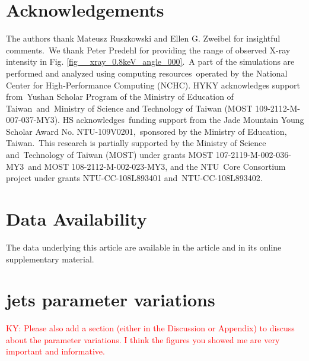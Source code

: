 \documentclass[fleqn,usenatbib,useAMS]{mnras}
\begin{document}
\section{Acknowledgements}
The authors thank Mateusz Ruszkowski and Ellen G. Zweibel for insightful comments.\
We thank Peter Predehl for providing the range of observed X-ray intensity in Fig. \ref{fig__xray_0.8keV_angle_000}.\
A part of the simulations are performed and analyzed using computing resources\
operated by the National Center for High-Performance Computing (NCHC).
HYKY acknowledges support from\
Yushan Scholar Program of the Ministry of Education of Taiwan\
and\
Ministry of Science and Technology of Taiwan (MOST 109-2112-M-007-037-MY3).
HS acknowledges\
funding support from the Jade Mountain Young Scholar Award No. NTU-109V0201,\
sponsored by the Ministry of Education, Taiwan.\
This research is partially supported by the Ministry of Science and\
Technology of Taiwan (MOST) under grants MOST 107-2119-M-002-036-MY3\
and MOST 108-2112-M-002-023-MY3, and the NTU\
Core Consortium project under grants NTU-CC-108L893401 and\
NTU-CC-108L893402.

\section*{Data Availability}
The data underlying this article are available in the article and in its online supplementary material.






\appendix
\section{jets parameter variations}
\textcolor{red}{KY: Please also add a section (either in the Discussion
or Appendix) to discuss about the parameter variations.
I think the figures you showed me are very important
and informative.}



\end{document}
